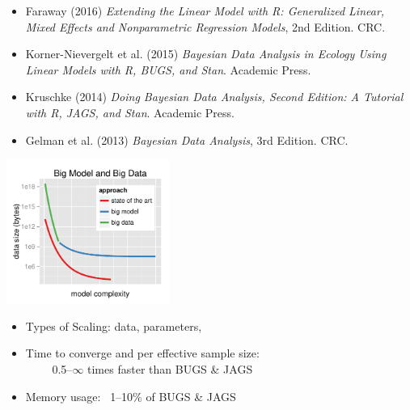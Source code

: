 \documentclass[10pt]{report}
\begin{document}
%
\begin{itemize}
\item Faraway (2016) {\slshape Extending the Linear Model with R: Generalized Linear, Mixed Effects and Nonparametric Regression Models}, 2nd Edition. CRC.
\item Korner-Nievergelt et al. (2015) {\slshape Bayesian Data Analysis in
    Ecology Using Linear Models with R, BUGS, and Stan}. Academic Press.
\item Kruschke (2014) {\slshape Doing Bayesian Data Analysis, Second
    Edition: A Tutorial with R, JAGS, and Stan}. Academic Press.
\item Gelman et al. (2013) {\slshape Bayesian Data Analysis}, 3rd Edition. CRC.
\end{itemize}


%
\begin{center}
\vspace*{-6pt}
\includegraphics[width=0.4\textwidth]{img/big-model-big-data.pdf}
\vspace*{-6pt}
\end{center}
\begin{itemize}
\item Types of Scaling: data, parameters, 
\item Time to converge and per effective sample size: \\[2pt]
\mbox{ } \ \ \ {0.5--{\large$\infty$} times faster than BUGS \& JAGS}
\item Memory usage: \ {1--10\% of BUGS \& JAGS}
\end{itemize}
\end{document}
